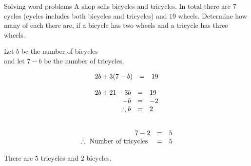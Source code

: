 \begin{wex}
{Solving word problems}
{
A shop sells bicycles and tricycles. In total there are $7$ cycles (cycles includes both bicycles and tricycles) and $19$ wheels. Determine how many of each there are, if a bicycle has two wheels and a tricycle has three wheels.
}
{
Let $b$ be the number of bicycles \\
and let $7-b$ be the number of tricycles. 

\begin{equation*}
\begin{array}{ccc}\hfill 2b+3(7-b)& =& 19\hfill \end{array}
\end{equation*}


\begin{equation*}
\begin{array}{ccl}
 \hfill 2b + 21 - 3b& =& 19\hfill \\
\hfill - b& =& -2\hfill \\
 \hfill \therefore b& =& 2\hfill 
\end{array}
\end{equation*}

\begin{equation*}
\begin{array}{ccl}
\\ \hfill  7 - 2 & =& 5\hfill \\
 \therefore \mbox{ Number of tricycles }& =& 5
\end{array}
\end{equation*}

 There are $5$ tricycles and $2$ bicycles.

}       
\end{wex}

